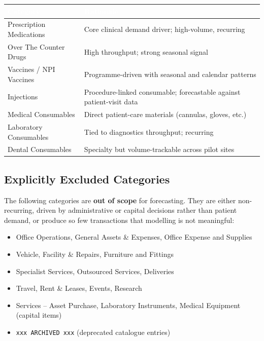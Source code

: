 \documentclass[12pt, a4paper]{article}
\begin{document}
\vspace{0.8em}
\noindent
\begin{tabularx}{\textwidth}{@{} L{4.2cm} X @{}}
  \toprule
  \textcolor{white}{\textbf{Category}} &
  \textcolor{white}{\textbf{Rationale}} \\
  \midrule
  Prescription Medications   & Core clinical demand driver; high-volume, recurring \\
  \addlinespace[2pt]
  Over The Counter Drugs     & High throughput; strong seasonal signal \\
  \addlinespace[2pt]
  Vaccines / NPI Vaccines    & Programme-driven with seasonal and calendar patterns \\
  \addlinespace[2pt]
  Injections                 & Procedure-linked consumable; forecastable against
                               patient-visit data \\
  \addlinespace[2pt]
  Medical Consumables        & Direct patient-care materials (cannulas, gloves, etc.) \\
  \addlinespace[2pt]
  Laboratory Consumables     & Tied to diagnostics throughput; recurring \\
  \addlinespace[2pt]
  Dental Consumables         & Specialty but volume-trackable across pilot sites \\
  \bottomrule
\end{tabularx}

\vspace{1em}

\subsection{Explicitly Excluded Categories}

The following categories are \textbf{out of scope} for forecasting. They are
either non-recurring, driven by administrative or capital decisions rather than
patient demand, or produce so few transactions that modelling is not meaningful:

\begin{itemize}[leftmargin=1.5em, itemsep=2pt]
  \item Office Operations, General Assets \& Expenses, Office Expense
        and Supplies
  \item Vehicle, Facility \& Repairs, Furniture and Fittings
  \item Specialist Services, Outsourced Services, Deliveries
  \item Travel, Rent \& Leases, Events, Research
  \item Services -- Asset Purchase, Laboratory Instruments,
        Medical Equipment (capital items)
  \item \texttt{xxx ARCHIVED xxx} (deprecated catalogue entries)
\end{itemize}
\end{document}
